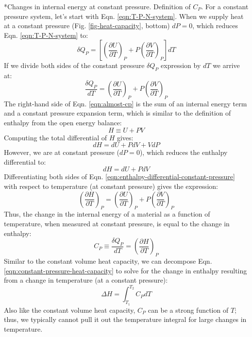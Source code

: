 \documentclass[11pt]{article}
\makeatletter
\theoremstyle{definition}
\renewcommand\subsubsection{\@startsection
	{subsubsection}{2}{0mm}
	{-0.05in}
	{-0.5\baselineskip}
	{\normalfont\normalsize\itshape}}
\makeatother
\begin{document}
\subsubsection*{Changes in internal energy at constant pressure. Definition of $C_{P}$.}
For a constant pressure system, let's start with Eqn. \eqref{eqn:T-P-N-system}. When we supply heat at a constant pressure (Fig. \ref{fig-heat-capacity}, bottom) $dP = 0$,
which reduces Eqn. \eqref{eqn:T-P-N-system} to:
\begin{equation}
	\delta{Q}_{P} = \left[\left(\frac{\partial{U}}{\partial{T}}\right)_{P}+P\left(\frac{\partial{V}}{\partial{T}}\right)_{P}\right]dT
\end{equation}If we divide both sides of the constant pressure $\delta{Q}_{P}$ expression by $dT$ we arrive at:
\begin{equation}\label{eqn:almost-cp}
	\frac{\delta{Q}_{P}}{dT} = \left(\frac{\partial{U}}{\partial{T}}\right)_{P}+P\left(\frac{\partial{V}}{\partial{T}}\right)_{P}
\end{equation}The right-hand side of Eqn. \eqref{eqn:almost-cp} is the sum of an internal energy term and a constant pressure expansion term, which is similar to the definition of
enthalpy from the open energy balance:
\begin{equation}\label{eqn:enthalpy}
	H \equiv U + PV
\end{equation}Computing the total differential of $H$ gives:
\begin{equation}
	dH = dU + PdV + VdP
\end{equation}However, we are at constant pressure ($dP = 0$), which reduces the enthalpy differential to:
\begin{equation}\label{eqn:enthalpy-differential-constant-pressure}
	dH = dU + PdV
\end{equation}Differentiating both sides of Eqn. \eqref{eqn:enthalpy-differential-constant-pressure} with respect to temperature (at constant pressure) gives the expression:
\begin{equation}
	\left(\frac{\partial{H}}{\partial{T}}\right)_{P} = \left(\frac{\partial{U}}{\partial{T}}\right)_{P} + P\left(\frac{\partial{V}}{\partial{T}}\right)_{P}
\end{equation}Thus, the change in the internal energy of a material as a function of temperature, when measured at constant pressure, is equal to the change in enthalpy:
\begin{equation}\label{eqn:constant-pressure-heat-capacity}
	C_{P}\equiv\frac{\delta{Q}_{P}}{dT} = \left(\frac{\partial{H}}{\partial{T}}\right)_{P}
\end{equation}Similar to the constant volume heat capacity, we can decompose Eqn. \eqref{eqn:constant-pressure-heat-capacity} to solve for the change in enthalpy resulting
from a change in temperature (at a constant pressure):
\begin{equation}
	\Delta{H} = \int_{T_{1}}^{T_{2}}C_{P}dT
\end{equation}Also like the constant volume heat capacity, $C_{P}$ can be a strong function of $T$;
thus, we typically cannot pull it out the temperature integral for large changes in temperature.
\end{document}
